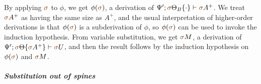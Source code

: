 \begin{itemize}
  By applying $\lf \sigma$ to $\phi$, we get $\phi(\lf\sigma)$, a
  derivation of
  $\foc{\Psi'}{\tackon{\lf\sigma\Theta_B}{\cdot}}{\lf\sigma{A^+}}$.
  We treat $\lf\sigma A^+$ as having the same size as $A^+$, and the
  usual interpretation of higher-order derivations is that
  $\phi(\lf\sigma)$ is a subderivation of $\phi$, so $\phi(\lf\sigma)$
  can be used to invoke the induction hypothesis.  From variable
  substitution, we get $\lf\sigma{M}$, a derivation of
  $\foc{\Psi'}{\tackon{\lf\sigma\Theta}{\lf\sigma{A^+}}}{\lf\sigma{U}}$,
  and then the result follows by the induction hypothesis on
  $\phi(\lf\sigma)$ and $\lf\sigma{M}$.

\end{itemize}

\paragraph{\it Substitution out of spines}

